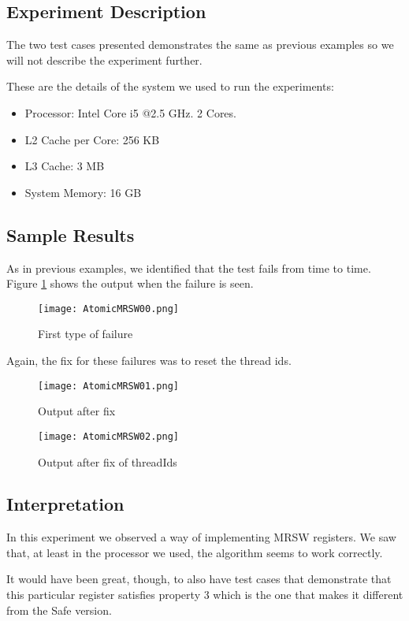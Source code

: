 \subsection{Experiment Description}
\par 
The two test cases presented demonstrates the same as previous examples so we
will not describe the experiment further. 
\par
These are the details of the system we used to run the experiments:
\begin{itemize}
\item Processor: Intel Core i5 @2.5 GHz. 2 Cores.
\item L2 Cache per Core: 256 KB
\item L3 Cache: 3 MB
\item System Memory: 16 GB
\end{itemize}
\subsection{Sample Results}
As in previous examples, we identified that the test fails from time to time.
Figure \ref{fig:AtomicMRSW00} shows the output when the failure is seen.
\par
\par
\begin{figure}[h]
  \centering
  \texttt{[image: AtomicMRSW00.png]}
  \caption{First type of failure}
  \label{fig:AtomicMRSW00}
\end{figure}
\par
Again, the fix for these failures was to reset the thread ids.
\par
\begin{figure}[h]
  \centering
  \texttt{[image: AtomicMRSW01.png]}
  \caption{Output after fix}
  \label{fig:AtomicMRSW01}
\end{figure}
\par
\begin{figure}[h]
  \centering
  \texttt{[image: AtomicMRSW02.png]}
  \caption{Output after fix of threadIds}
  \label{fig:AtomicMRSW03}
\end{figure}
\par
\subsection{Interpretation}
\par
In this experiment we observed a way of implementing MRSW registers. We saw
that, at least in the processor we used, the algorithm seems to work correctly.
\par
It would have been great, though, to also have test cases that demonstrate that this
particular register satisfies property 3 which is the one that makes it
different from the Safe version.
